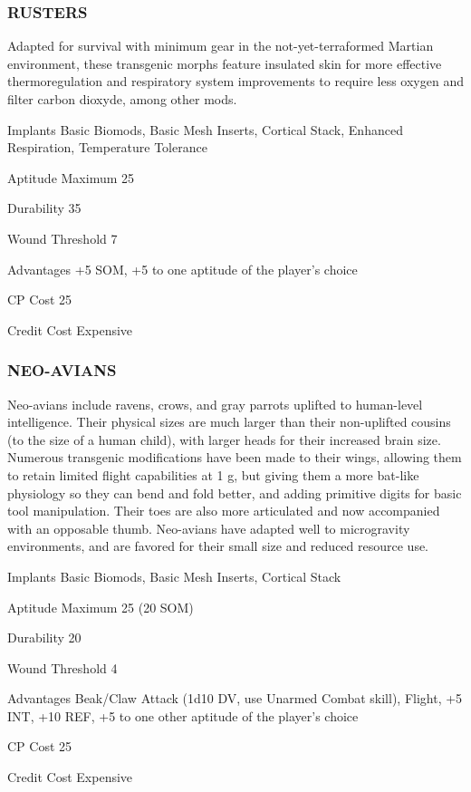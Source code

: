 \subsubsection{RUSTERS}
Adapted for survival with minimum gear in the not-yet-terraformed Martian
environment, these transgenic morphs feature insulated skin for more effective
thermoregulation and respiratory system improvements to require less oxygen
and filter carbon dioxyde, among other mods.

\begin{description*}
\item[Implants] Basic Biomods, Basic Mesh Inserts, Cortical Stack, Enhanced
  Respiration, Temperature Tolerance
\item[Aptitude Maximum] 25 
\item[Durability] 35 
\item[Wound Threshold] 7 
\item[Advantages] +5 SOM, +5 to one aptitude of the player’s choice 
\item[CP Cost] 25 
\item[Credit Cost] Expensive 
\end{description*}

\subsubsection{NEO-AVIANS}
Neo-avians include ravens, crows, and gray parrots uplifted to human-level
intelligence. Their physical sizes are much larger than their non-uplifted
cousins (to the size of a human child), with larger heads for their increased
brain size. Numerous transgenic modifications have been made to their wings,
allowing them to retain limited flight capabilities at 1 g, but giving them a
more bat-like physiology so they can bend and fold better, and adding primitive
digits for basic tool manipulation. Their toes are also more articulated and
now accompanied with an opposable thumb. Neo-avians have adapted well to
microgravity environments, and are favored for their small size and reduced
resource use.

\begin{description*}
\item[Implants] Basic Biomods, Basic Mesh Inserts, Cortical Stack
\item[Aptitude Maximum] 25 (20 SOM) 
\item[Durability] 20 
\item[Wound Threshold] 4 
\item[Advantages] Beak/Claw Attack (1d10 DV, use Unarmed Combat skill), Flight,
  +5 INT, +10 REF, +5 to one other aptitude of the player’s choice
\item[CP Cost] 25 
\item[Credit Cost] Expensive 
\end{description*}

